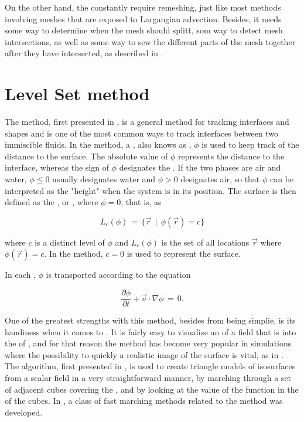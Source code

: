 On the other hand, the constantly require remeshing, just like most methods involving meshes that are exposed to Largangian advection. Besides, it needs some way to determine when the mesh should splitt, som way to detect mesh intersections, as well as some way to sew the different parts of the mesh together after they have intersected, as described in \citep{Wojtan2009}.

\section{Level Set method}

The \LS method, first presented in \citep{Osher1988}, is a general method for tracking interfaces and shapes and is one of the most common ways to track interfaces between two immiscible fluids. In the \LS method, a , also knows as , $\phi$ is used to keep track of the distance to the surface. The absolute value of $\phi$ represents the distance to the interface, whereas the sign of $\phi$ designates the \phase. If the two phases are air and water, $\phi \leq 0$ usually designates water and $\phi > 0$ designates air, so that $\phi$ can be interpreted as the "height" when the system is in its \equilibrium position. The surface is then defined as the \isosurface, or , where $\phi = 0$, that is, as

\begin{equation} \label{eq:level_set}
L_c(\phi) \,=\, \{\vec{r} \,\mid\, \phi(\vec{r})=c\}
\end{equation}

where $c$ is a distinct level of $\phi$ and $L_c(\phi)$ is the set of all locations $\vec{r}$ where $\phi(\vec{r}) = c$. In the \LS method, $c = 0$ is used to represent the surface.

In each , $\phi$ is transported according to the equation

\begin{equation} \label{eq:level_set_function_transport}
\frac{\partial\phi}{\partial t} + \vec{u}\cdot\nabla\phi \,=\, 0.
\end{equation}

One of the greatest strengths with this method, besides from being simplie, is its handiness when it comes to . It is fairly easy to visualize an \isosurface of a field that is \discretized into the \nodes of , and for that reason the \LS method has become very popular in \FVM simulations where the possibility to quickly \render a realistic image of the surface is vital, as in \citep{Losasso2004,Chentanez2011}. The  algorithm, first presented in \citep{Lorensen1987}, is used to create triangle models of isosurfaces from a scalar field in a very straightforward manner, by marching through a set of adjacent cubes covering the , and by looking at the value of the function in the  of the cubes. In \citep{Sethian1995}, a class of fast marching methods related to the \LS method was developed.


